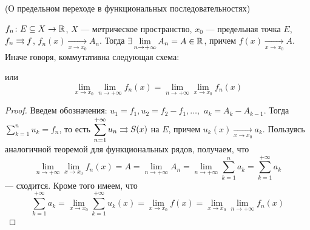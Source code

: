 \begin{theorem}(О предельном переходе в функциональных последовательностях)

    $f_n \colon E \subseteq X \to \mathbb{R}$, $X$ --- метрическое пространство,
    $x_0$ --- предельная точка $E$, $f_n \rightrightarrows f$, $f_n(x) \xrightarrow[x \to
    x_0]{} A_n$. Тогда $\displaystyle \exists \lim_{n \to +\infty}{A_n} = A \in
    \mathbb{R}$, причем $f(x) \xrightarrow[x \to x_0]{} A$.
    Иначе говоря, коммутативна следующая схема:


    или
\[
    \lim_{x \to x_0}{\lim_{n \to +\infty}{f_n(x)}}
    = \lim_{n \to +\infty}{\lim_{x \to x_0}{f_n(x)}}
\]
\end{theorem}
\begin{proof}
    Введем обозначения: $u_1 = f_1, u_2 = f_2 - f_1, \ldots,$ $a_k = A_k -
    A_{k - 1}$. Тогда $\displaystyle \sum_{k = 1}^{n}{u_k} = f_n$, то есть
    $\displaystyle \sum_{n = 1}^{+\infty}{u_n} \rightrightarrows S(x)$ на $E$, причем
    $u_k(x) \xrightarrow[x \to x_0]{} a_k$. Пользуясь аналогичной теоремой для
    функциональных рядов, получаем, что
\[
    \lim_{n \to +\infty}{\lim_{x \to x_0}{f_n(x)}} = A = \lim_{n \to
    +\infty}{A_n} = \lim_{n \to +\infty}{\sum_{k = 1}^{n}{a_k}} = \sum_{k =
    1}^{+\infty}{a_k}
\]
    --- сходится. Кроме того имеем, что
\[
    \sum_{k = 1}^{+\infty}{a_k} = \lim_{x \to x_0}{\sum_{k =
    1}^{+\infty}{u_k(x)}} = \lim_{x \to x_0}{f(x)} = \lim_{x \to x_0}{\lim_{n
    \to +\infty}{f_n(x)}}
\]

\end{proof}
